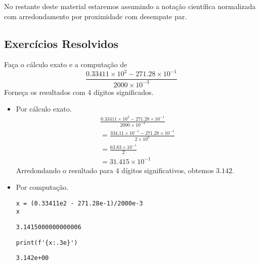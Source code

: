 No restante deste material estaremos assumindo a notação científica normalizada com arredondamento por proximidade com desempate par.

\subsection{Exercícios Resolvidos}

\begin{exeresol}
  Faça o cálculo exato e a computação de
  \begin{equation}
    \frac{0.33411\times 10^2 - 271.28\times 10^{-1}}{2000\times 10^{-3}}
  \end{equation}
  Forneça os resultados com 4 dígitos significados.
\end{exeresol}
\begin{resol}
  \begin{itemize}
  \item Por cálculo exato.
    \begin{gather}
      \frac{0.33411\times 10^2 - 271.28\times 10^{-1}}{2000\times 10^{-3}}\\
      = \frac{334.11\times 10^{-1} - 271.28\times 10^{-1}}{2\times 10^0}\\
      = \frac{63.83\times 10^{-1}}{2}\\
      = 31.415\times 10^{-1}
    \end{gather}
    Arredondando o resultado para 4 dígitos significativos, obtemos $3.142$.
  \item Por computação.

\begin{lstlisting}
x = (0.33411e2 - 271.28e-1)/2000e-3
x
\end{lstlisting}

\begin{verbatim}
3.1415000000000006
\end{verbatim}

\begin{lstlisting}
print(f'{x:.3e}')
\end{lstlisting}

\begin{verbatim}
3.142e+00
\end{verbatim}

  \end{itemize}
\end{resol}


